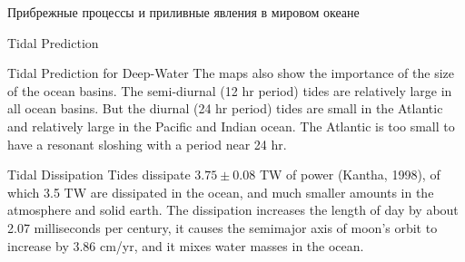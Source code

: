 \begin{chapter}{Прибрежные процессы и приливные явления в мировом океане}
\begin{section}{Tidal Prediction}
\begin{paragraph}{Tidal Prediction for Deep-Water}
The maps also show the importance of the size of the ocean basins. The
semi-diurnal (12 hr period) tides are
relatively large in all ocean basins. But the
diurnal (24 hr period) tides are small in the
Atlantic and relatively large in the Pacific and Indian ocean. The
Atlantic is too small to have a resonant sloshing with a period near
24 hr.
%
\end{paragraph}

\begin{paragraph}{Tidal Dissipation}
Tides dissipate $3.75\pm0.08$ TW of power
(Kantha, 1998), of which 3.5 TW are dissipated in the ocean, and much
smaller amounts in the atmosphere and solid earth. The dissipation
increases the length of day by about 2.07 milliseconds per century, it
causes the semimajor axis of moon's orbit to increase by 3.86 cm/yr,
and it mixes water masses in the ocean.
%


\end{paragraph}
\end{section}
\end{chapter}
